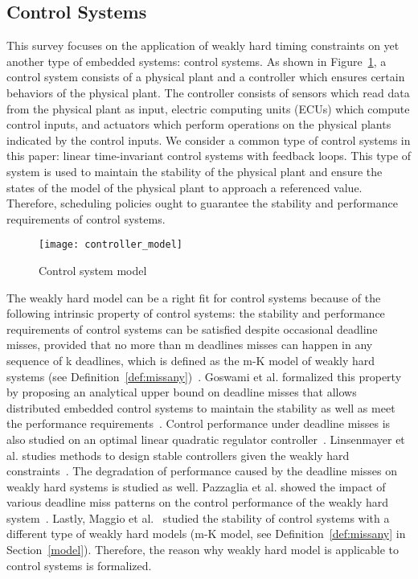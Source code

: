 \subsection{Control Systems}
This survey focuses on the application of weakly hard timing constraints on yet another type of embedded systems: control systems. As shown in Figure~\ref{fig:controller_model}, a control system consists of a physical plant and a controller which ensures certain behaviors of the physical plant. The controller consists of sensors which read data from the physical plant as input, electric computing units (ECUs) which compute control inputs, and actuators which perform operations on the physical plants indicated by the control inputs. We consider a common type of control systems in this paper: linear time-invariant control systems with feedback loops. This type of system is used to maintain the stability of the physical plant and ensure the states of the model of the physical plant to approach a referenced value. Therefore, scheduling policies ought to guarantee the stability and performance requirements of control systems. 

\begin{figure}[h!]
\caption{Control system model}
\centering
\texttt{[image: controller\_model]}
\label{fig:controller_model}
\end{figure}

The weakly hard model can be a right fit for control systems because of the following intrinsic property of control systems: the stability and performance requirements of control systems can be satisfied despite occasional deadline misses, provided that no more than m deadlines misses can happen in any sequence of k deadlines, which is defined as the m-K model of weakly hard systems (see Definition~\ref{def:missany})~\cite{hamdaoui1995dynamic, ramanathan1999overload}. Goswami et al. formalized this property by proposing an analytical upper bound on deadline misses that allows distributed embedded control systems to maintain the stability as well as meet the performance requirements~\cite{goswami2014relax}. Control performance under deadline misses is also studied on an optimal linear quadratic regulator controller~\cite{horssen2016performance}. Linsenmayer et al. studies methods to design stable controllers given the weakly hard constraints~\cite{linsenmayer2017stabilization}. The degradation of performance caused by the deadline misses on weakly hard systems is studied as well. Pazzaglia et al. showed the impact of various deadline miss patterns on the control performance of the weakly hard system~\cite{pazzaglia2018beyond}. Lastly, Maggio et al.~\cite{maggio2020control} studied the stability of control systems with a different type of weakly hard models (m-K model, see Definition~\ref{def:missany} in Section~\ref{model}). Therefore, the reason why weakly hard model is applicable to control systems is formalized. 

